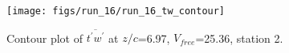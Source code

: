 \begin{figure}[H]
\centering
\texttt{[image: figs/run\_16/run\_16\_tw\_contour]}
\caption{Contour plot of $\overline{t^\prime w^\prime}$ at $z/c$=6.97, $V_{free}$=25.36, station 2.}
\label{fig:run_16_tw_contour}
\end{figure}


